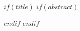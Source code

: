 $if(title)$
{\usebackgroundtemplate{\acefaiddutitlebg}
\frame{\titlepage}}
$if(abstract)$
\begin{abstract}
$abstract$
\end{abstract}
$endif$
$endif$
